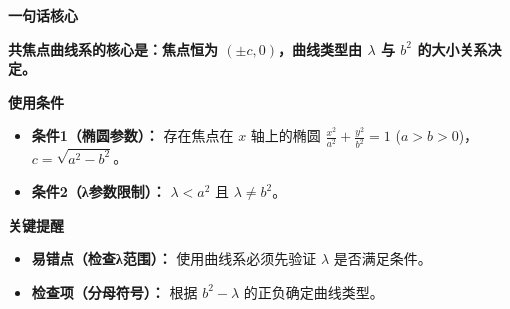 \begin{summarybox}
	\textbf{\textcolor{CSummary}{一句话核心}}

	\medskip
	\textbf{共焦点曲线系的核心是：焦点恒为 $(\pm c,0)$，曲线类型由 $\lambda$ 与 $b^{2}$ 的大小关系决定。}

	\medskip
	\textbf{\textcolor{CSummary}{使用条件}}
	\begin{itemize}[leftmargin=*,itemsep=0.5em,topsep=0.4em]
		\item \textbf{条件1（椭圆参数）：} 存在焦点在 $x$ 轴上的椭圆 $\frac{x^{2}}{a^{2}}+\frac{y^{2}}{b^{2}}=1$ ($a>b>0$)，$c=\sqrt{a^{2}-b^{2}}$。
		\item \textbf{条件2（λ参数限制）：} $\lambda<a^{2}$ 且 $\lambda\neq b^{2}$。
	\end{itemize}

	\medskip
	\textbf{\textcolor{CSummary}{关键提醒}}
	\begin{itemize}[leftmargin=*,itemsep=0.5em,topsep=0.4em]
		\item \textbf{易错点（检查λ范围）：} 使用曲线系必须先验证 $\lambda$ 是否满足条件。
		\item \textbf{检查项（分母符号）：} 根据 $b^{2}-\lambda$ 的正负确定曲线类型。
	\end{itemize}

\end{summarybox}
